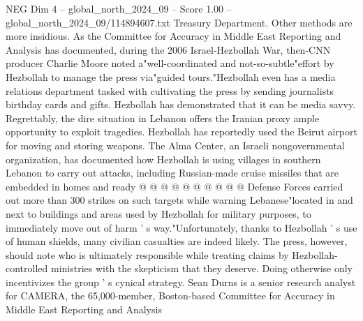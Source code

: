 \begin{textsample}{NEG Dim 4 – global\_north\_2024\_09 – Score 1.00 – global\_north\_2024\_09/114894607.txt}
Treasury Department.
Other methods are more insidious.
As the Committee for Accuracy in Middle East Reporting and Analysis has documented, during the 2006 Israel-Hezbollah War, then-CNN producer Charlie Moore noted a"well-coordinated and not-so-subtle"effort by Hezbollah to manage the press via"guided tours."Hezbollah even has a media relations department tasked with cultivating the press by sending journalists birthday cards and gifts.
Hezbollah has demonstrated that it can be media savvy.
Regrettably, the dire situation in Lebanon offers the Iranian proxy ample opportunity to exploit tragedies.
Hezbollah has reportedly used the Beirut airport for moving and storing weapons.
The Alma Center, an Israeli nongovernmental organization, has documented how Hezbollah is using villages in southern Lebanon to carry out attacks, including Russian-made cruise missiles that are embedded in homes and ready @ @ @ @ @ @ @ @ @ @ Defense Forces carried out more than 300 strikes on such targets while warning Lebanese"located in and next to buildings and areas used by Hezbollah for military purposes, to immediately move out of harm ' s way."Unfortunately, thanks to Hezbollah ' s use of human shields, many civilian casualties are indeed likely.
The press, however, should note who is ultimately responsible while treating claims by Hezbollah-controlled ministries with the skepticism that they deserve.
Doing otherwise only incentivizes the group ' s cynical strategy.
Sean Durns is a senior research analyst for CAMERA, the 65,000-member, Boston-based Committee for Accuracy in Middle East Reporting and Analysis

\end{textsample}
